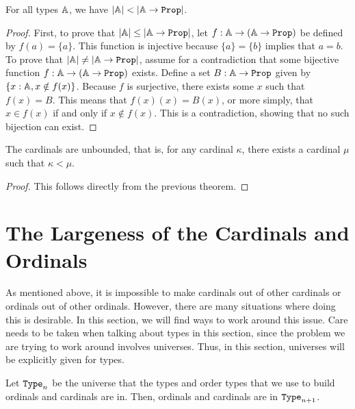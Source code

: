 \documentclass[../../math.tex]{subfiles}
\begin{document}
\begin{theorem} \label{power_set_bigger}
    For all types $\mathbb{A}$, we have $|\A| < |\A \to \Prop|$.
\end{theorem}
\begin{proof}
    First, to prove that $|\A| \leq |\A \to \Prop|$, let $f : \A \to (\A \to
    \Prop)$ be defined by $f(a) = \{a\}$.  This function is injective because
    $\{a\} = \{b\}$ implies that $a = b$.  To prove that $|\A| \neq |\A \to
    \Prop|$, assume for a contradiction that some bijective function $f : \A \to
    (\A \to \Prop)$ exists.  Define a set $B : \A \to \Prop$ given by $\{x : \mathbb{A},
    x \notin f(x)\}$.  Because $f$ is surjective, there exists some $x$ such
    that $f(x) = B$.  This means that $f(x)(x) = B(x)$, or more simply, that $x
    \in f(x)$ if and only if $x \notin f(x)$.  This is a contradiction, showing
    that no such bijection can exist.
\end{proof}

\begin{theorem} \label{card_unbounded}
    The cardinals are unbounded, that is, for any cardinal $\kappa$, there
    exists a cardinal $\mu$ such that $\kappa < \mu$.
\end{theorem}
\begin{proof}
    This follows directly from the previous theorem.
\end{proof}

\section{The Largeness of the Cardinals and Ordinals}

As mentioned above, it is impossible to make cardinals out of other cardinals or
ordinals out of other ordinals.  However, there are many situations where doing
this is desirable.  In this section, we will find ways to work around this
issue.  Care needs to be taken when talking about types in this section, since
the problem we are trying to work around involves universes.  Thus, in this
section, universes will be explicitly given for types.

Let $\Type_n$ be the universe that the types and order types that we use to
build ordinals and cardinals are in.  Then, ordinals and cardinals are in
$\Type_{n + 1}$.
\end{document}
